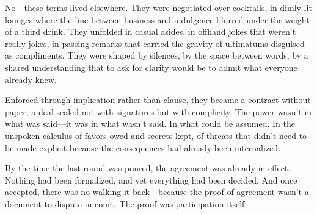 No—these terms lived elsewhere. They were negotiated over cocktails, in dimly lit lounges where the line between business and indulgence blurred under the weight of a third drink. They unfolded in casual asides, in offhand jokes that weren’t really jokes, in passing remarks that carried the gravity of ultimatums disguised as compliments. They were shaped by silences, by the space between words, by a shared understanding that to ask for clarity would be to admit what everyone already knew.

Enforced through implication rather than clause, they became a contract without paper, a deal sealed not with signatures but with complicity. The power wasn’t in what was said—it was in what wasn’t said. In what could be assumed. In the unspoken calculus of favors owed and secrets kept, of threats that didn’t need to be made explicit because the consequences had already been internalized.

By the time the last round was poured, the agreement was already in effect. Nothing had been formalized, and yet everything had been decided. And once accepted, there was no walking it back—because the proof of agreement wasn’t a document to dispute in court. The proof was participation itself.

